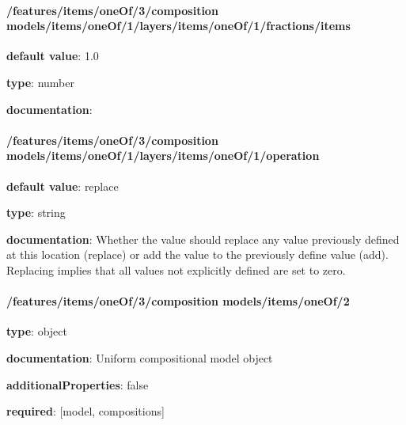 \begin{itemized}
\paragraph{/features/items/oneOf/3/composition models/items/oneOf/1/layers/items/oneOf/1/fractions/items} \begin{itemized}
\item {\bf default value}: 1.0
\item {\bf type}: number
\item {\bf documentation}: 
\end{itemized}\end{itemized}\paragraph{/features/items/oneOf/3/composition models/items/oneOf/1/layers/items/oneOf/1/operation} \begin{itemized}
\item {\bf default value}: replace
\item {\bf type}: string
\item {\bf documentation}: Whether the value should replace any value previously defined at this location (replace) or add the value to the previously define value (add). Replacing implies that all values not explicitly defined are set to zero.
\end{itemized}\paragraph{/features/items/oneOf/3/composition models/items/oneOf/2} \begin{itemized}
\item {\bf type}: object
\item {\bf documentation}: Uniform compositional model object
\item {\bf additionalProperties}: false
\item {\bf required}: [model, compositions]\end{itemized}
